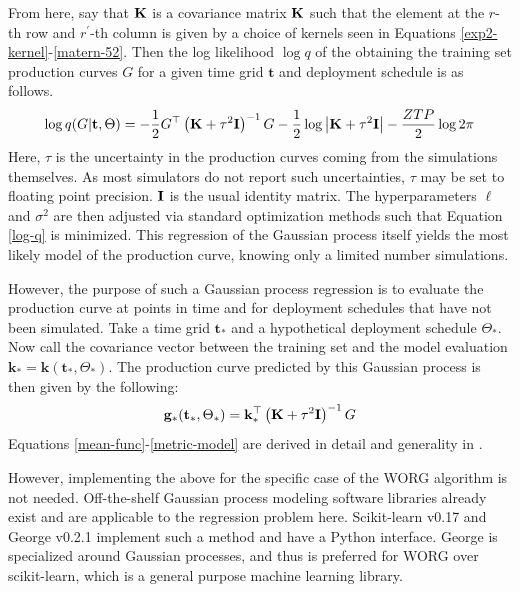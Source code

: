 From here, say that $\mathbf{K}$ is a covariance matrix $\mathbf{K}$ 
such that the element at the $r$-th row and $r^\prime$-th column is 
given by a choice of kernels seen in 
Equations \ref{exp2-kernel}-\ref{matern-52}. Then the 
log likelihood $\log q$ of the obtaining the training set production curves 
$G$ for a given time grid $\mathbf{t}$ and deployment schedule is as follows.
\begin{equation}
\label{log-q}
\log q(G|\mathbf{t}, \Theta) 
    = -\frac{1}{2}G^\top\left(\mathbf{K} + \tau^2\mathbf{I}\right)^{-1}G
      -\frac{1}{2}\log\left|\mathbf{K} + \tau^2\mathbf{I}\right|
      -\frac{ZTP}{2}\log 2\pi
\end{equation}
Here, $\tau$ is the uncertainty in the production curves coming from the 
simulations themselves. As most simulators do not report such uncertainties, 
$\tau$ may be set to floating point precision. $\mathbf{I}$ is the usual identity 
matrix. The hyperparameters $\ell$ and $\sigma^2$ are then adjusted via 
standard optimization methods such that Equation \ref{log-q} is minimized. 
This regression of the Gaussian process itself yields the most likely 
model of the production curve, knowing only a limited number simulations.

However, the purpose of such a Gaussian process regression is to evaluate 
the production curve at points in time and for deployment schedules that 
have not been simulated. Take a time grid $\mathbf{t_*}$ and a hypothetical
deployment schedule $\Theta_*$. Now call the covariance vector between
the training set and the model evaluation    
$\mathbf{k}_* = \mathbf{k}(\mathbf{t_*}, \Theta_*)$. 
The production curve predicted by this Gaussian process is then given by
the following:
\begin{equation}
\label{metric-model}
\mathbf{g}_*(\mathbf{t}_*, \Theta_*) = 
    \mathbf{k}_*^\top \left(\mathbf{K} + \tau^2\mathbf{I}\right)^{-1}G
\end{equation}
Equations \ref{mean-func}-\ref{metric-model} are derived in detail and
generality in \cite{rasmussen2006gaussian}. 

However, implementing the above for the specific case of the WORG algorithm 
is not needed.  Off-the-shelf Gaussian process modeling software 
libraries already exist and are applicable to the regression problem here.
Scikit-learn v0.17 \cite{scikit-learn} and George v0.2.1 \cite{hodlr} 
implement such a method and have a Python interface. George is specialized 
around Gaussian processes, and thus is preferred for WORG over scikit-learn, 
which is a general purpose machine learning library.

